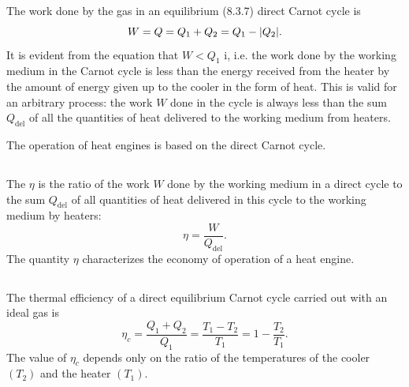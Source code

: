 \subsection{}\label{11.1.8} The work done by the gas in an equilibrium (8.3.7) direct Carnot cycle is
\begin{equation*}%
W = Q = Q_{1} + Q_{2} = Q_{1} - \abs{Q_{2}}.
\end{equation*}
It is evident from the equation that $W< Q_{1}$ i, i.e. the work done by the working medium  in the Carnot cycle is less than the energy received from the heater by the amount of energy given up to the cooler in the form of heat. This is valid for an arbitrary process: the work $W$ done in the cycle is always less than the sum $Q_{\textrm{del}}$ of all the quantities of heat delivered to the working medium from heaters. 

The operation of heat engines is based on the direct Carnot cycle.

\subsection{}\label{11.1.9} The  $\eta$ is the ratio of the work $W$ done by the working medium in a direct cycle to the sum $Q_{\textrm{del}}$ of all quantities of heat delivered in this cycle to the working medium by heaters:
\begin{equation*}%
\eta = \frac{W}{Q_{\textrm{del}}}.
\end{equation*}
The quantity $\eta$ characterizes the economy of operation of a heat engine.

\subsection{}\label{11.1.10} The thermal efficiency of a direct equilibrium Carnot cycle carried out with an ideal gas is
\begin{equation*}%
\eta_{c} = \frac{Q_{1}+Q_{2}}{Q_{1}} = \frac{T_{1}-T_{2}}{T_{1}} = 1 - \frac{T_{2}}{T_{1}}.
\end{equation*}
The value of $\eta_{c}$ depends only on the ratio of the temperatures of the cooler $(T_{2})$ and the heater $(T_{1})$.

